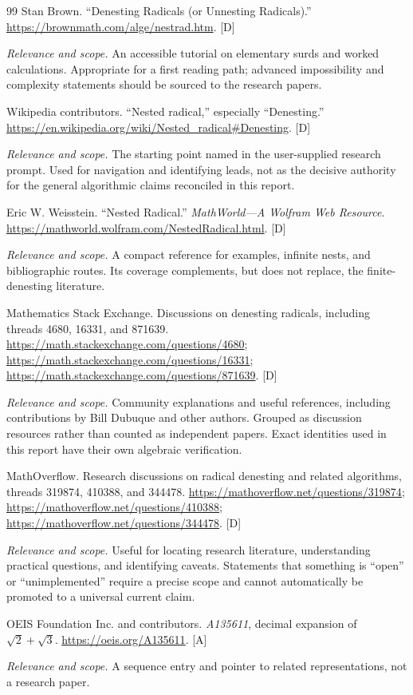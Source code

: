 \documentclass[11pt,oneside]{article}
\numberwithin{equation}{section}
\theoremstyle{definition}
\theoremstyle{remark}
\newcommand{\status}[1]{\textsf{\small[#1]}}
\newcommand{\entrynote}[1]{\par\smallskip\noindent\emph{Relevance and scope.} #1}
\begin{document}
\begin{thebibliography}{99}
Stan Brown. ``Denesting Radicals (or Unnesting Radicals).'' \url{https://brownmath.com/alge/nestrad.htm}. \status{D}
\entrynote{An accessible tutorial on elementary surds and worked calculations. Appropriate for a first reading path; advanced impossibility and complexity statements should be sourced to the research papers.}

Wikipedia contributors. ``Nested radical,'' especially ``Denesting.'' \url{https://en.wikipedia.org/wiki/Nested_radical#Denesting}. \status{D}
\entrynote{The starting point named in the user-supplied research prompt. Used for navigation and identifying leads, not as the decisive authority for the general algorithmic claims reconciled in this report.}

Eric W. Weisstein. ``Nested Radical.'' \emph{MathWorld---A Wolfram Web Resource}. \url{https://mathworld.wolfram.com/NestedRadical.html}. \status{D}
\entrynote{A compact reference for examples, infinite nests, and bibliographic routes. Its coverage complements, but does not replace, the finite-denesting literature.}

Mathematics Stack Exchange. Discussions on denesting radicals, including threads 4680, 16331, and 871639. \url{https://math.stackexchange.com/questions/4680}; \url{https://math.stackexchange.com/questions/16331}; \url{https://math.stackexchange.com/questions/871639}. \status{D}
\entrynote{Community explanations and useful references, including contributions by Bill Dubuque and other authors. Grouped as discussion resources rather than counted as independent papers. Exact identities used in this report have their own algebraic verification.}

MathOverflow. Research discussions on radical denesting and related algorithms, threads 319874, 410388, and 344478. \url{https://mathoverflow.net/questions/319874}; \url{https://mathoverflow.net/questions/410388}; \url{https://mathoverflow.net/questions/344478}. \status{D}
\entrynote{Useful for locating research literature, understanding practical questions, and identifying caveats. Statements that something is ``open'' or ``unimplemented'' require a precise scope and cannot automatically be promoted to a universal current claim.}

OEIS Foundation Inc. and contributors. \emph{A135611}, decimal expansion of $\sqrt2+\sqrt3$. \url{https://oeis.org/A135611}. \status{A}
\entrynote{A sequence entry and pointer to related representations, not a research paper.}


\end{thebibliography}
\end{document}
